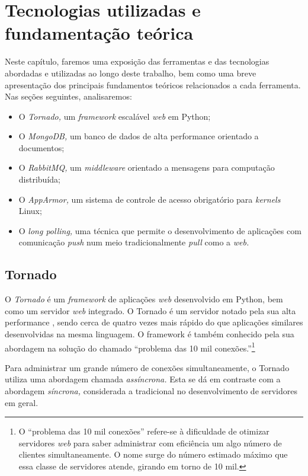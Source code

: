 \documentclass[ruledheader, 12pt]{abnt}
\begin{document}
\chapter{Tecnologias utilizadas e fundamentação teórica}

Neste capítulo, faremos uma exposição das ferramentas e das tecnologias abordadas e utilizadas ao longo deste trabalho, bem como uma breve apresentação dos principais fundamentos teóricos relacionados a cada ferramenta. Nas seções seguintes, analisaremos:
\begin{itemize}
	\item O \emph{Tornado,} um \emph{framework} escalável \emph{web} em Python;
	\item O \emph{MongoDB,} um banco de dados de alta performance orientado a documentos;
	\item O \emph{RabbitMQ,} um \emph{middleware} orientado a mensagens para computação distribuída;
	\item O \emph{AppArmor,} um sistema de controle de acesso obrigatório para \emph{kernels} Linux;
	\item O \emph{long polling,} uma técnica que permite o desenvolvimento de aplicações com comunicação \emph{push} num meio tradicionalmente \emph{pull} como a \emph{web.}
\end{itemize}	
	
\section{Tornado}

O \emph{Tornado} é um \emph{framework} de aplicações \emph{web} desenvolvido em Python, bem como um servidor \emph{web} integrado. O Tornado é um servidor notado pela sua alta performance \cite{tornado2009}, sendo cerca de quatro vezes mais rápido do que aplicações similares desenvolvidas na mesma linguagem. O framework é também conhecido pela sua abordagem na solução do chamado ``problema das 10 mil conexões.''\footnote{O ``problema das 10 mil conexões'' refere-se à dificuldade de otimizar servidores \emph{web} para saber administrar com eficiência um algo número de clientes simultaneamente. O nome surge do número estimado máximo que essa classe de servidores atende, girando em torno de 10 mil.}


Para administrar um grande número de conexões simultaneamente, o Tornado utiliza uma abordagem chamada \emph{assíncrona.} Esta se dá em contraste com a abordagem \emph{síncrona,} considerada a tradicional no desenvolvimento de servidores em geral.
\end{document}
